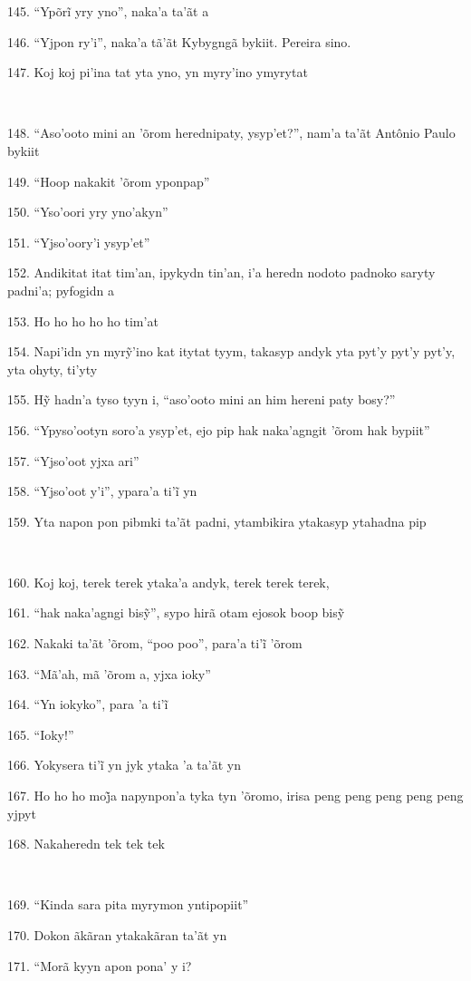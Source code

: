 145. ``Ypõrĩ yry yno'', naka’a ta’ãt a

146. ``Yjpon ry'i'', naka'a tã'ãt Kybygngã bykiit. Pereira sino.

147. Koj koj pi'ina tat yta yno, yn myry'ino ymyrytat

~

148. ``Aso'ooto mini an 'õrom herednipaty, ysyp'et?'', nam'a ta'ãt
Antônio Paulo bykiit

149. ``Hoop nakakit 'õrom yponpap''

150. ``Yso'oori yry yno'akyn''

151. ``Yjso'oory'i ysyp'et''

152. Andikitat itat tim'an, ipykydn tin'an, i'a heredn nodoto padnoko
saryty padni'a; pyfogidn a

153. Ho ho ho ho ho tim'at

154. Napi’idn yn myrỹ’ino kat itytat tyym, takasyp andyk yta pyt’y pyt’y pyt’y, yta ohyty, ti’yty

155. Hỹ hadn’a tyso tyyn i, ``aso’ooto mini an him hereni paty bosy?''

156. ``Ypyso'ootyn soro'a ysyp'et, ejo pip hak naka'agngit 'õrom hak
bypiit''

157. ``Yjso'oot yjxa ari''

158. ``Yjso’oot y’i'', ypara’a ti’ĩ yn

159. Yta napon pon pibmki ta'ãt padni, ytambikira ytakasyp ytahadna pip

~

160. Koj koj, terek terek ytaka'a andyk, terek terek terek,

161. ``hak naka’agngi bisỹ'', sypo hirã otam ejosok boop bisỹ

162. Nakaki ta’ãt ’õrom, ``poo poo'', para’a ti’ĩ ’õrom

163. ``Mã'ah, mã 'õrom a, yjxa ioky''

164. ``Yn iokyko'', para ’a ti’ĩ

165. ``Ioky!''

166. Yokysera ti’ĩ yn jyk ytaka ’a ta’ãt yn

167. Ho ho ho moj̃a napynpon’a tyka tyn ’õromo, irisa peng peng peng peng peng yjpyt

168. Nakaheredn tek tek tek

~

169. ``Kinda sara pita myrymon yntipopiit''

170. Dokon ãkãran ytakakãran ta'ãt yn

171. ``Morã kyyn apon pona' y i?

